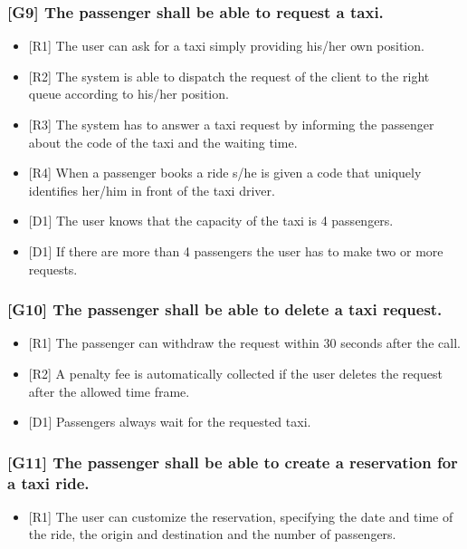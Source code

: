 \documentclass[a4paper,11pt]{report} %
\begin{document}
	\subsubsection{{[}G9{]} The passenger shall be able to request a taxi.}
	\begin{itemize}
		\item {[}R1{]} The user can ask for a taxi simply providing his/her own position.
		\item {[}R2{]} The system is able to dispatch the request of the client to the right queue according to his/her position.
		\item {[}R3{]} The system has to answer a taxi request by informing the passenger about the code of the taxi and the waiting time.
		\item {[}R4{]} When a passenger books a ride s/he is given a code that uniquely identifies her/him in front of the taxi driver.
		\item {[}D1{]} The user knows that the capacity of the taxi is 4 passengers.
		\item {[}D1{]} If there are more than 4 passengers the user has to make two or more requests.
	\end{itemize}
	
	\subsubsection{{[}G10{]} The passenger shall be able to delete a taxi request.}
	\begin{itemize}
		\item {[}R1{]} The passenger can withdraw the request within 30 seconds after the call.
		\item {[}R2{]} A penalty fee is automatically collected if the user deletes the request after the allowed time frame.
		\item {[}D1{]} Passengers always wait for the requested taxi.
	\end{itemize}
	
	\subsubsection{{[}G11{]} The passenger shall be able to create a reservation for a taxi ride.}
	\begin{itemize}
		\item {[}R1{]} The user can customize the reservation, specifying the date and time of the ride, the origin and destination and the number of passengers.
	\end{itemize}
	
\end{document}
